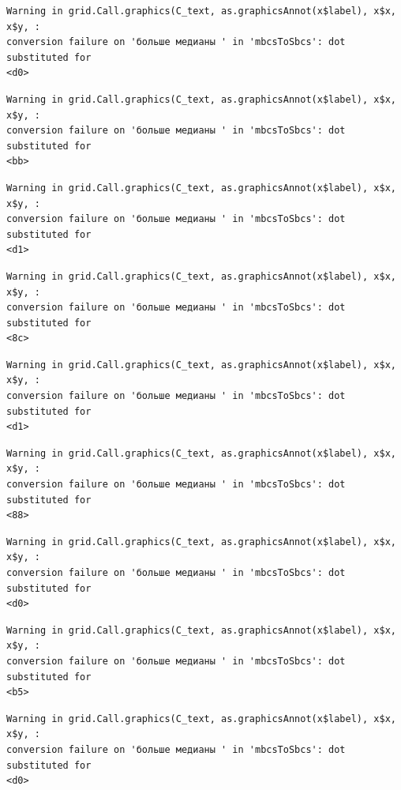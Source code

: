 \documentclass[
  letterpaper,
]{scrbook}
\theoremstyle{definition}
\theoremstyle{remark}
\begin{document}
\begin{verbatim}
Warning in grid.Call.graphics(C_text, as.graphicsAnnot(x$label), x$x, x$y, :
conversion failure on 'больше медианы ' in 'mbcsToSbcs': dot substituted for
<d0>
\end{verbatim}

\begin{verbatim}
Warning in grid.Call.graphics(C_text, as.graphicsAnnot(x$label), x$x, x$y, :
conversion failure on 'больше медианы ' in 'mbcsToSbcs': dot substituted for
<bb>
\end{verbatim}

\begin{verbatim}
Warning in grid.Call.graphics(C_text, as.graphicsAnnot(x$label), x$x, x$y, :
conversion failure on 'больше медианы ' in 'mbcsToSbcs': dot substituted for
<d1>
\end{verbatim}

\begin{verbatim}
Warning in grid.Call.graphics(C_text, as.graphicsAnnot(x$label), x$x, x$y, :
conversion failure on 'больше медианы ' in 'mbcsToSbcs': dot substituted for
<8c>
\end{verbatim}

\begin{verbatim}
Warning in grid.Call.graphics(C_text, as.graphicsAnnot(x$label), x$x, x$y, :
conversion failure on 'больше медианы ' in 'mbcsToSbcs': dot substituted for
<d1>
\end{verbatim}

\begin{verbatim}
Warning in grid.Call.graphics(C_text, as.graphicsAnnot(x$label), x$x, x$y, :
conversion failure on 'больше медианы ' in 'mbcsToSbcs': dot substituted for
<88>
\end{verbatim}

\begin{verbatim}
Warning in grid.Call.graphics(C_text, as.graphicsAnnot(x$label), x$x, x$y, :
conversion failure on 'больше медианы ' in 'mbcsToSbcs': dot substituted for
<d0>
\end{verbatim}

\begin{verbatim}
Warning in grid.Call.graphics(C_text, as.graphicsAnnot(x$label), x$x, x$y, :
conversion failure on 'больше медианы ' in 'mbcsToSbcs': dot substituted for
<b5>
\end{verbatim}

\begin{verbatim}
Warning in grid.Call.graphics(C_text, as.graphicsAnnot(x$label), x$x, x$y, :
conversion failure on 'больше медианы ' in 'mbcsToSbcs': dot substituted for
<d0>
\end{verbatim}
\end{document}
